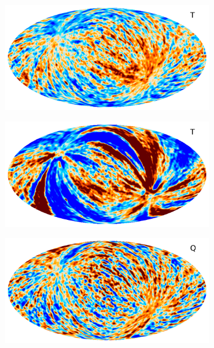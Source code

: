 \documentclass[twocolumn]{aa}
\begin{document}
\begin{figure}[t]
    \centering
    \begin{subfigure}{0.45\textwidth}
       \includegraphics[width=0.95\linewidth]{figs/ncorr_timedep_T.pdf}
    \end{subfigure}
    \begin{subfigure}{0.45\textwidth}
       \includegraphics[width=0.95\linewidth]{figs/ncorr_timeindep_T.pdf}
    \end{subfigure}
    \begin{subfigure}{0.45\textwidth}
       \includegraphics[width=0.95\linewidth]{figs/ncorr_timedep_Q.pdf}
    \end{subfigure}

\end{figure}
\end{document}
